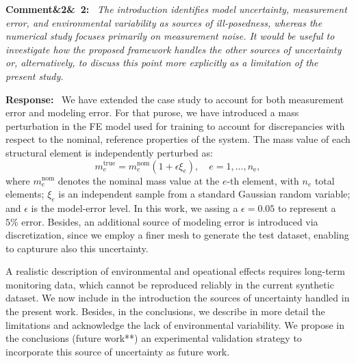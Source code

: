 \documentclass[11pt]{article}
\newenvironment{rcomment}[1]{\par\bigskip\noindent\textbf{Comment\ifx&#1&\else\ #1\fi:}\ \itshape}{\par}
\newenvironment{response}{\par\smallskip\noindent\color{resp}\textbf{Response:}\ }{\par}
\begin{document}
\begin{rcomment}{2}
The introduction identifies model uncertainty, measurement error, and environmental variability as sources of
ill-posedness, whereas the numerical study focuses primarily on measurement noise. It would be useful to investigate how
the proposed framework handles the other sources of uncertainty or, alternatively, to discuss this point more explicitly
as a limitation of the present study.
\end{rcomment}

\begin{response}
We have extended the case study to account for both measurement error and modeling error. 
For that purose, we have introduced a mass perturbation in the FE model used for training to account for discrepancies with respect to the nominal, reference properties of the system. 
The mass value of each structural element is independently perturbed as: 
\begin{equation}
	m_e^{\text{true}} = m_e^{\text{nom}} \left(1 + \epsilon \xi_e\right), \quad e = 1, \dots, n_{\text{e}},
	\label{eq:modeling_error}
\end{equation}
where $m_e^{\text{nom}}$ denotes the nominal mass value at the $e$-th element, with $n_{e}$ total elements; $\xi_e$ is an independent sample from a standard Gaussian random variable; and $\epsilon$ is the model-error level. 
In this work, we assing a $\epsilon = 0.05$ to represent a $5\%$ error. 
Besides, an additional source of modeling error is introduced via discretization, since we employ a finer mesh to generate the test dataset, enabling to capturure also this uncertainty. 

A realistic description of environmental and opeational effects requires long-term monitoring data, which cannot be reproduced reliably in the current synthetic dataset. 
We now include in the introduction the sources of uncertainty handled in the present work. 
Besides, in the conclusions, we describe in more detail the limitations and acknowledge the lack of environmental variability. 
We propose in the conclusions (future work**) an experimental validation strategy to incorporate this source of uncertainty as future work.



\end{response}
\end{document}
